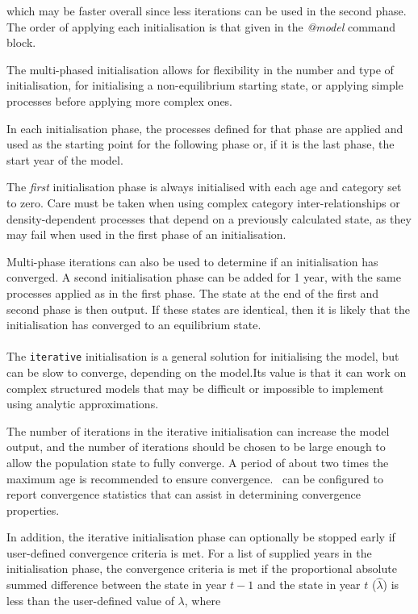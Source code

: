 which may be faster overall since less iterations can be used in the second phase. The order of applying each initialisation is that given in the \textit{@model} command block.
 
The multi-phased initialisation allows for flexibility in the number and type of initialisation, for initialising a non-equilibrium starting state, or applying simple processes before applying more complex ones.

In each initialisation phase, the processes defined for that phase are applied and used as the starting point for the following phase or, if it is the last phase, the start year of the model.

The \emph{first} initialisation phase is always initialised with each age and category set to zero. Care must be taken when using complex category inter-relationships or density-dependent processes that depend on a previously calculated state, as they may fail when used in the first phase of an initialisation.

Multi-phase iterations can also be used to determine if an initialisation has converged. A second initialisation phase can be added for 1 year, with the same processes applied as in the first phase. The state at the end of the first and second phase is then output. If these states are identical, then it is likely that the initialisation has converged to an equilibrium state.

\paragraph{}

The \texttt{iterative} initialisation is a general solution for initialising the model, but can be slow to converge, depending on the model.Its value is that it can work on complex structured models that may be difficult or impossible to implement using analytic approximations.

The number of iterations in the iterative initialisation can increase the model output, and the number of iterations should be chosen to be large enough to allow the population state to fully converge. A period of about two times the maximum age is recommended to ensure convergence. \CNAME~can be configured to report convergence statistics that can assist in determining convergence properties.

In addition, the iterative initialisation phase can optionally be stopped early if user-defined convergence criteria is met. For a list of supplied years in the initialisation phase, the convergence criteria is met if the proportional absolute summed difference between the state in year $t-1$ and the state in year $t$ ($\widehat{\lambda}$) is less than the user-defined value of $\lambda$, where

